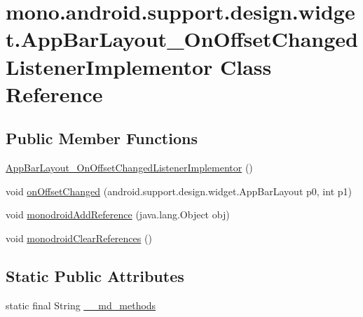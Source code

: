 \hypertarget{classmono_1_1android_1_1support_1_1design_1_1widget_1_1_app_bar_layout___on_offset_changed_listener_implementor}{
\section{mono.android.support.design.widget.AppBarLayout\_\-OnOffsetChangedListenerImplementor Class Reference}
\label{classmono_1_1android_1_1support_1_1design_1_1widget_1_1_app_bar_layout___on_offset_changed_listener_implementor}
}
\subsection*{Public Member Functions}
\begin{CompactItemize}
\item 
\hyperlink{classmono_1_1android_1_1support_1_1design_1_1widget_1_1_app_bar_layout___on_offset_changed_listener_implementor_58c0b48a6627c921e900f090155d0f0b}{AppBarLayout\_\-OnOffsetChangedListenerImplementor} ()
\item 
void \hyperlink{classmono_1_1android_1_1support_1_1design_1_1widget_1_1_app_bar_layout___on_offset_changed_listener_implementor_f1be42fc96cfda1bab1940dac3ed4b2c}{onOffsetChanged} (android.support.design.widget.AppBarLayout p0, int p1)
\item 
void \hyperlink{classmono_1_1android_1_1support_1_1design_1_1widget_1_1_app_bar_layout___on_offset_changed_listener_implementor_94f7dac03362f2ea2f4b89d993e82cb6}{monodroidAddReference} (java.lang.Object obj)
\item 
void \hyperlink{classmono_1_1android_1_1support_1_1design_1_1widget_1_1_app_bar_layout___on_offset_changed_listener_implementor_2bbedeb12ef96e9b75d0f95796625e8b}{monodroidClearReferences} ()
\end{CompactItemize}
\subsection*{Static Public Attributes}
\begin{CompactItemize}
\item 
static final String \hyperlink{classmono_1_1android_1_1support_1_1design_1_1widget_1_1_app_bar_layout___on_offset_changed_listener_implementor_881f917db1121db046dd9110ea6e5a23}{\_\-\_\-md\_\-methods}
\end{CompactItemize}
